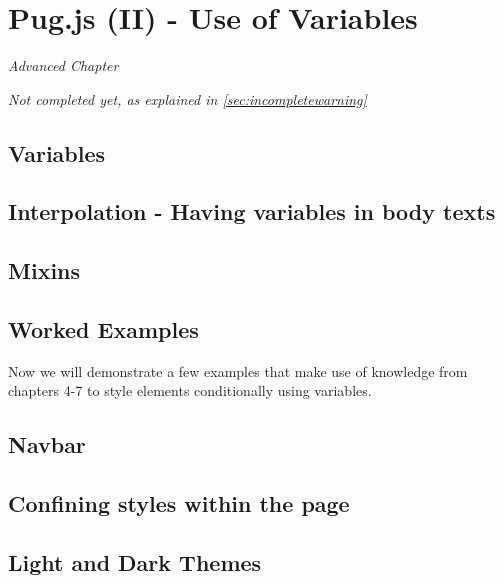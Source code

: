 \chapter{Pug.js (II) - Use of Variables}
\label{sec:pug2}


\textit{Advanced Chapter}
\vspace{6mm}

\textit{Not completed yet, as explained in \cref{sec:incompletewarning}}
\vspace{6mm}

\section{Variables}


\section{Interpolation - Having variables in body texts}


\section{Mixins}


\section{Worked Examples}


Now we will demonstrate a few examples that make use of knowledge from chapters 4-7 to style elements conditionally using variables.

\section{Navbar}
\label{sec:navbar}

\section{Confining styles within the page}
\label{sec:confinestyles}

\section{Light and Dark Themes}

